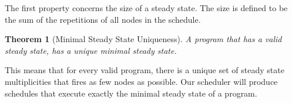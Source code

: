 \documentclass{sig-alt-full}
\newtheorem{theorem}{Theorem}
\newtheorem{lemma}{Lemma}
\newtheorem{corollary}{Corollary}
\begin{document}
The first property concerns the size of a steady state.  The size is
defined to be the sum of the repetitions of all nodes in the schedule.

\begin{theorem}[Minimal Steady State Uniqueness]
A {\StreamIt} program that has a valid steady state, has a unique
minimal steady state.
\end{theorem}

This means that for every valid {\StreamIt} program, there is a unique
set of steady state multiplicities that fires as few nodes as
possible.  Our scheduler will produce schedules that execute exactly
the minimal steady state of a program.

\begin{comment}
\begin{proof}[Minimal Steady State Uniqueness]
Assume that there are two different minimal steady states with
same size.  Let $m$ and $q$ denote vectors representing the two
steady states. Let $\sum_i m_i$ denote size of schedule $m$ and
$\sum_i q_i$ denote size of schedule $q$. Note that since both $m$
and $q$ are minimal steady states, $\sum_i m_i = \sum_i q_i$.
Since the schedules are different, there must be some $j$ for
which $m_j \ne q_j$. Assume without loss of generality that $m_j <
q_j$. Since a steady state does not change the amount of data
buffered between nodes, the node producing data for node $i$ must
also execute less times than corresponding node in $q$. Similarly,
the node consuming data produced by node $j$ also must execute
less times than the corresponding node in schedule $q$. Since a
{\StreamIt} program describes a connected graph, it follows that
$\forall i, m_i < q_i$.  Thus $\sum_i m_i \ne \sum_i q_i$, which
is a contradiction. Thus there cannot be two different minimal
steady state.
\end{proof}

\begin{corollary}[Minimal Steady State Uniqueness]
\label{corollary:minimal-state}
The additional property we have from the above proof is that if
$m$ represents a minimal steady and $q$ any other steady state,
then $\forall i, m_i < q_i$.
\end{corollary}

\begin{lemma}[Composition of Steady Schedules]
\label{lemma:composition}
If $m$ and $q$ are two steady states for a {\StreamIt} program, then
$m + q$ is also a steady state.
\end{lemma}


\end{comment}
\end{document}
